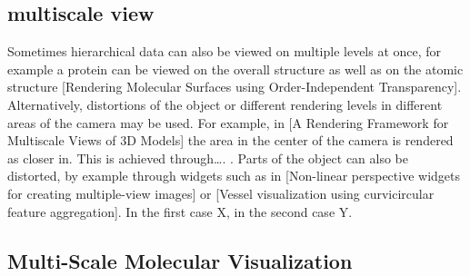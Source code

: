 \documentclass[review,journal]{vgtc}         %
\begin{document}
%
%




\subsection{multiscale view}
Sometimes hierarchical data can also be viewed on multiple levels at once, for example a protein can be viewed on the overall structure as well as on the atomic structure [Rendering Molecular Surfaces using Order-Independent Transparency]. 
Alternatively, distortions of the object or different rendering levels in different areas of the camera may be used. 
For example, in [A Rendering Framework for Multiscale Views of 3D Models] the area in the center of the camera is rendered as closer in. 
This is achieved through…. . Parts of the object can also be distorted, by example through widgets such as in [Non-linear perspective widgets for creating multiple-view images] or [Vessel visualization using curvicircular feature aggregation]. 
In the first case X, in the second case Y.

\subsection{Multi-Scale Molecular Visualization}
\end{document}
